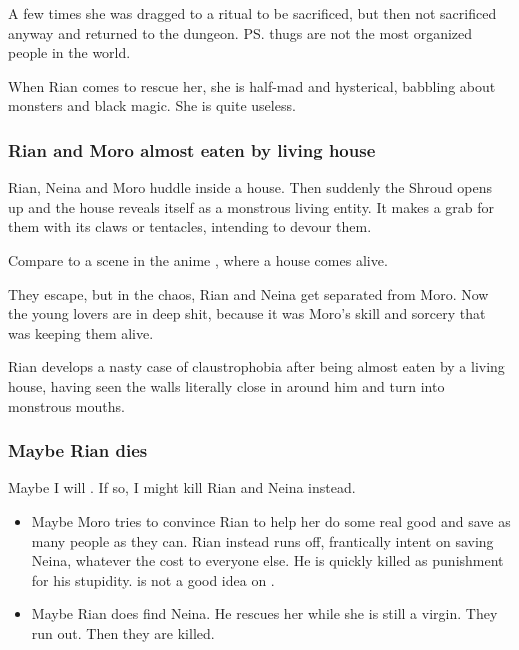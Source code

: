 A few times she was dragged to a ritual to be sacrificed, but then not sacrificed anyway and returned to the dungeon. 
\ps{\Psyrex}{} thugs are not the most organized people in the world. 

When Rian comes to rescue her, she is half-mad and hysterical, babbling about monsters and black magic. She is quite useless. 





\subsubsection{Rian and Moro almost eaten by living house}
Rian, Neina and Moro huddle inside a house. Then suddenly the Shroud opens up and the house reveals itself as a monstrous living entity. It makes a grab for them with its claws or tentacles, intending to devour them. 

Compare to a scene in the anime \cite[episode 1]{Anime:IczerOne}, where a house comes alive.

They escape, but in the chaos, Rian and Neina get separated from Moro. Now the young lovers are in deep shit, because it was Moro's skill and sorcery that was keeping them alive.

Rian develops a nasty case of claustrophobia after being almost eaten by a living house, having seen the walls literally close in around him and turn into monstrous mouths. 





\subsubsection{Maybe Rian dies}
Maybe I will . 
If so, I might kill Rian and Neina instead.

\begin{itemize}
  \item 
    Maybe Moro tries to convince Rian to help her do some real good and save as many people as they can.
    Rian instead runs off, frantically intent on saving Neina, whatever the cost to everyone else. 
    He is quickly killed as punishment for his stupidity.
     is not a good idea on \Miith. 
    
  \item 
    Maybe Rian does find Neina.
    He rescues her while she is still a virgin.
    They run out. 
    Then they are killed. 
\end{itemize}

